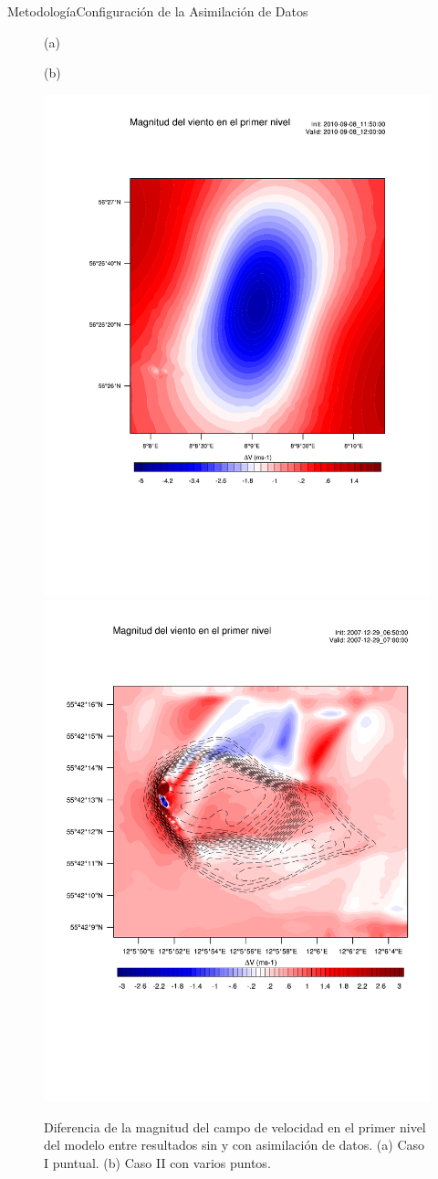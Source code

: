 \documentclass[mathserif,10pt]{beamer}
\begin{document}
\begin{frame}{Metodología}{Configuración de la Asimilación de Datos}
	\begin{figure}[H]
		\centering
		\begin{minipage}{0.5\linewidth}
			\center\hspace{0.3cm}(a)
		\end{minipage}%
		\begin{minipage}{0.5\linewidth}
			\center\hspace{0.3cm}(b)
		\end{minipage}%
		
		\includegraphics[width=0.5\linewidth,page=1,trim={2.5cm 6.2cm 1cm 4.5cm},clip]{fig/05/eta1_da_hov}%
		\includegraphics[width=0.5\linewidth,page=1,trim={1.0cm 5.2cm 1cm 4.5cm},clip]{fig/05/eta1_da_bol}%
		\caption{Diferencia de la magnitud del campo de velocidad en el primer nivel del modelo entre resultados sin y con asimilación de datos. (a) Caso I puntual. (b) Caso II con varios puntos.}
		\label{fig:05_da_expl}
	\end{figure}
\end{frame}
\end{document}
